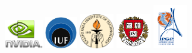 \documentclass[oneside,english]{book}
\begin{document}
\begin{figure}[htbp]
\noindent \begin{centering}
\includegraphics[width=0.15\textwidth]{figures/logo_NVIDIA}\vspace*{2truemm}
\includegraphics[width=0.125\textwidth]{figures/logo_IUF}\vspace*{2truemm}
\includegraphics[width=0.135\textwidth]{figures/logo_Caltech}\vspace*{2truemm}
\includegraphics[width=0.135\textwidth]{figures/logo_Harvard}\vspace*{2truemm}
\includegraphics[width=0.135\textwidth]{figures/logo_IPGP}\vspace*{2truemm}
\par\end{centering}


\end{figure}
\end{document}
